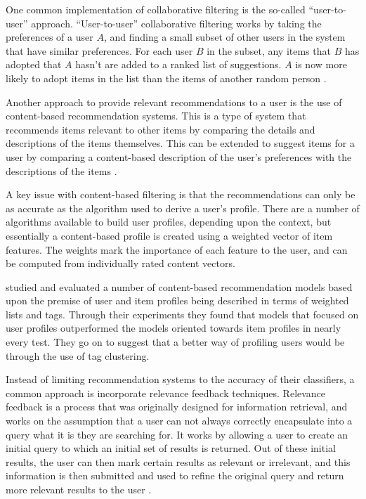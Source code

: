 \documentclass[11pt,a4paper]{report}
\begin{document}
One common implementation of collaborative filtering is the so-called ``user-to-user'' approach. ``User-to-user'' collaborative filtering works by taking the preferences of a user $A$, and finding a small subset of other users in the system that have similar preferences. For each user $B$ in the subset, any items that $B$ has adopted that $A$ hasn't are added to a ranked list of suggestions. $A$ is now more likely to adopt items in the list than the items of another random person \parencite{Schafer:2001}.

Another approach to provide relevant recommendations to a user is the use of content-based recommendation systems. This is a type of system that recommends items relevant to other items by comparing the details and descriptions of the items themselves. This can be extended to suggest items for a user by comparing a content-based description of the user's preferences with the descriptions of the items \parencite{Pazzani:2007}.

A key issue with content-based filtering is that the recommendations can only be as accurate as the algorithm used to derive a user's profile. There are a number of algorithms available to build user profiles, depending upon the context, but essentially a content-based profile is created using a weighted vector of item features. The weights mark the importance of each feature to the user, and can be computed from individually rated content vectors.

\textcite{Cantador:2010} studied and evaluated a number of content-based recommendation models based upon the premise of user and item profiles being described in terms of weighted lists and tags. Through their experiments they found that models that focused on user profiles outperformed the models oriented towards item profiles in nearly every test. They go on to suggest that a better way of profiling users would be through the use of tag clustering.

Instead of limiting recommendation systems to the accuracy of their classifiers, a common approach is incorporate relevance feedback techniques. Relevance feedback is a process that was originally designed for information retrieval, and works on the assumption that a user can not always correctly encapsulate into a query what it is they are searching for. It works by allowing a user to create an initial query to which an initial set of results is returned. Out of these initial results, the user can then mark certain results as relevant or irrelevant, and this information is then submitted and used to refine the original query and return more relevant results to the user \parencite{Salton:1990}.
\end{document}
